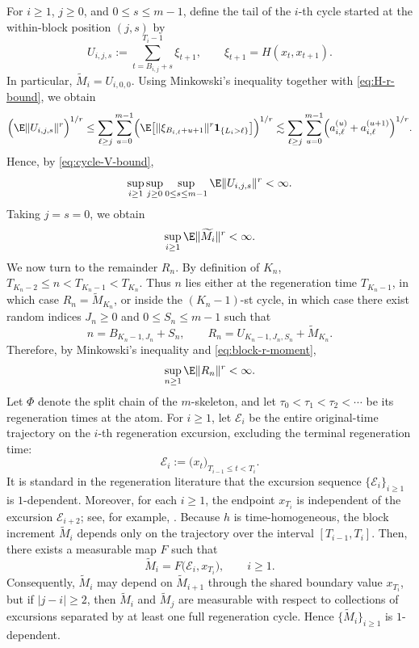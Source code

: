 \documentclass[mnsc,nonblindrev]{informs3}
\begin{document}
For \(i\ge1\), \(j\ge0\), and \(0\le s\le m-1\), define the tail of the
\(i\)-th cycle started at the within-block position \((j,s)\) by
\[
U_{i,j,s}
:=
\sum_{t=B_{i,j}+s}^{T_i-1}\xi_{t+1},
\qquad
\xi_{t+1}=H(x_t,x_{t+1}).
\]
In particular, $\widetilde M_i=U_{i,0,0}.$ Using Minkowski's inequality together with \eqref{eq:H-r-bound}, we obtain
\begin{align*}
\Bigl(\E\|U_{i,j,s}\|^r\Bigr)^{1/r}
\le
\sum_{\ell\ge j}\sum_{u=0}^{m-1}
\Bigl(
\E\bigl[\|\xi_{B_{i,\ell}+u+1}\|^r\mathbf 1_{\{L_i>\ell\}}\bigr]
\Bigr)^{1/r} \lesssim
\sum_{\ell\ge j}\sum_{u=0}^{m-1}
\Bigl(
a_{i,\ell}^{(u)}+a_{i,\ell}^{(u+1)}
\Bigr)^{1/r}.
\end{align*}
Hence, by \eqref{eq:cycle-V-bound},
\[
\sup_{i\ge1}\sup_{j\ge0}\sup_{0\le s\le m-1}\E\|U_{i,j,s}\|^r<\infty.
\]
Taking \(j=s=0\), we obtain
\begin{equation}\label{eq:block-r-moment}
\sup_{i\ge1}\E\|\widetilde M_i\|^r<\infty.
\end{equation}
We now turn to the remainder \(R_n\). By definition of \(K_n\), $T_{K_n-2}\le n<T_{K_n-1}<T_{K_n}.$ Thus \(n\) lies either at the regeneration time \(T_{K_n-1}\), in which case
\(R_n=\widetilde M_{K_n}\), or inside the \((K_n-1)\)-st cycle, in which case
there exist random indices \(J_n\ge0\) and \(0\le S_n\le m-1\) such that
\[
n=B_{K_n-1,J_n}+S_n, \qquad R_n=U_{K_n-1,J_n,S_n}+\widetilde M_{K_n}.
\]
Therefore, by Minkowski's inequality and \eqref{eq:block-r-moment},
\[
\sup_{n\ge1}\E\|R_n\|^r<\infty.
\]
Let \(\Phi\) denote the split chain of the \(m\)-skeleton, and let
\(\tau_0<\tau_1<\tau_2<\cdots\) be its regeneration times at the atom.
For \(i\ge1\), let \(\mathcal E_i\) be the entire original-time trajectory on
the \(i\)-th regeneration excursion, excluding the terminal regeneration time:
\[
\mathcal E_i:=\bigl(x_t\bigr)_{T_{i-1}\le t<T_i}.
\]
It is standard in the regeneration literature that the excursion sequence
\(\{\mathcal E_i\}_{i\ge1}\) is \(1\)-dependent. Moreover, for each \(i\ge1\),
the endpoint \(x_{T_i}\) is independent of the excursion \(\mathcal E_{i+2}\);
see, for example, \cite{Meyn12_book}. Because \(h\) is time-homogeneous, the block increment \(\widetilde M_i\)
depends only on the trajectory over the interval \([T_{i-1},T_i]\). Then, there exists a measurable map \(F\) such that
\[
\widetilde M_i = F\bigl(\mathcal E_i,x_{T_i}\bigr),\qquad i\ge1.
\]
Consequently, \(\widetilde M_i\) may depend on \(\widetilde M_{i+1}\) through
the shared boundary value \(x_{T_i}\), but if \(|j-i|\ge2\), then
\(\widetilde M_i\) and \(\widetilde M_j\) are measurable with respect to
collections of excursions separated by at least one full regeneration cycle.
Hence \(\{\widetilde M_i\}_{i\ge1}\) is \(1\)-dependent.
\end{document}
